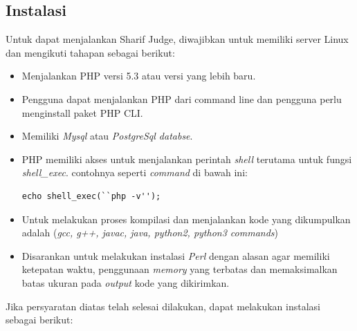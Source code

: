 \subsection{Instalasi}
\label{sec:Instalasi}
Untuk dapat menjalankan Sharif Judge, diwajibkan untuk memiliki server Linux dan mengikuti tahapan sebagai berikut:
\begin{itemize}
    \item Menjalankan PHP versi 5.3 atau versi yang lebih baru.
    \item Pengguna dapat menjalankan PHP dari command line  dan pengguna perlu menginstall paket PHP CLI.
    \item Memiliki \textit{Mysql} atau \textit{PostgreSql databse}.
    \item PHP memiliki akses untuk menjalankan perintah \textit{shell} terutama untuk fungsi \textit{shell\_exec}. contohnya seperti \textit{command} di bawah ini: 
    
     \begin{lstlisting}[basicstyle=\ttfamily, frame=single,
    columns=fullflexible, breaklines=true, numbers=none]
echo shell_exec(``php -v'');
    \end{lstlisting}
    
    \item Untuk melakukan proses kompilasi dan menjalankan kode yang dikumpulkan adalah (\textit{gcc, g++, javac, java, python2, python3 commands})
    \item Disarankan untuk melakukan instalasi \textit{Perl} dengan alasan agar memiliki ketepatan waktu, penggunaan \textit{memory} yang terbatas dan memaksimalkan batas ukuran pada \textit{output} kode yang dikirimkan.
\end{itemize}
Jika persyaratan diatas telah selesai dilakukan, dapat melakukan instalasi sebagai berikut: 
